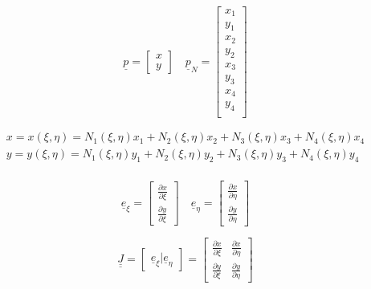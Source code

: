 \documentclass[a4paper]{jpconf}
\begin{document}
\begin{equation}
\underline{p}=\begin{bmatrix}
x\\y
\end{bmatrix}\quad\underline{p}_{N}=\begin{bmatrix}
x_{1}\\y_{1}\\x_{2}\\y_{2}\\x_{3}\\y_{3}\\x_{4}\\y_{4}\\
\end{bmatrix}
\end{equation}

\begin{equation}
\begin{split}
x = x\left(\xi,\eta\right) = N_{1}\left(\xi,\eta\right)x_{1}+N_{2}\left(\xi,\eta\right)x_{2}+N_{3}\left(\xi,\eta\right)x_{3}+N_{4}\left(\xi,\eta\right)x_{4}\\
y = y\left(\xi,\eta\right) = N_{1}\left(\xi,\eta\right)y_{1}+N_{2}\left(\xi,\eta\right)y_{2}+N_{3}\left(\xi,\eta\right)y_{3}+N_{4}\left(\xi,\eta\right)y_{4}\\
\end{split}
\end{equation}

\begin{equation}
\underline{e}_{\xi}=\begin{bmatrix}
\frac{\partial x}{\partial\xi}\\\frac{\partial y}{\partial\xi}
\end{bmatrix}\quad\underline{e}_{\eta}=\begin{bmatrix}
\frac{\partial x}{\partial\eta}\\\frac{\partial y}{\partial\eta}
\end{bmatrix}
\end{equation}

\begin{equation}
\underline{\underline{J}}=\begin{bmatrix}
\underline{e}_{\xi}|\underline{e}_{\eta}
\end{bmatrix}=\begin{bmatrix}
\frac{\partial x}{\partial\xi}&\frac{\partial x}{\partial\eta}\\\frac{\partial y}{\partial\xi}&\frac{\partial y}{\partial\eta}
\end{bmatrix}
\end{equation}
\end{document}

